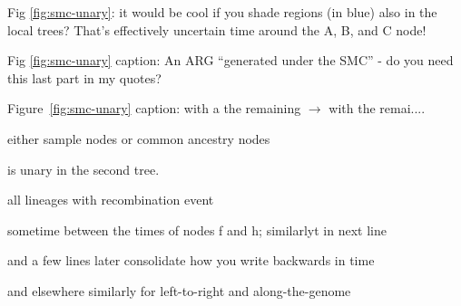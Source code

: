 
\begin{point}{Fig \ref{fig:smc-unary}:}
 it would be cool if you shade regions (in blue) also in the local trees? That's effectively uncertain time around the A, B, and C node!
\end{point}

\reply{
}

\begin{point}{Fig \ref{fig:smc-unary} caption:}
An ARG ``generated under the SMC'' - do you need this last part in my quotes?
\end{point}


\begin{point}{Figure~\ref{fig:smc-unary} caption:}
with a the remaining $\to$ with the remai....
\end{point}


\begin{point}{\revref} %
 either sample nodes or common ancestry nodes
\end{point}


\begin{point}{\revref} %
 is unary in the second tree.
\end{point}


\begin{point}{\revref} %
 all lineages with recombination event
\end{point}


\begin{point}{\revref} %
 sometime between the times of nodes f and h; similarlyt in next line %
\end{point}


\begin{point}{\revref{} and a few lines later} %
 consolidate how you write backwards in time
\end{point}


\begin{point}{\revref{} and elsewhere}
similarly for left-to-right and along-the-genome
\end{point}

